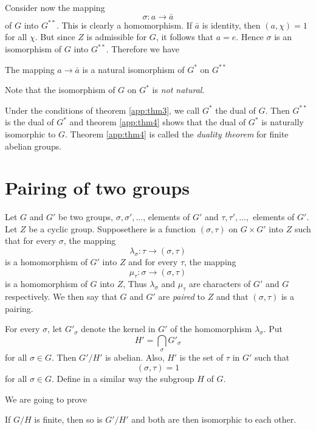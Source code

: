 Consider now the mapping
$$
\sigma : a \to \bar{a}
$$
of $G$ into $G^{**}$. This is clearly a homomorphism. If $\bar{a}$ is
identity, then $(a, \chi)=1$ for all $\chi$. But since $Z$ is
admissible for $G$, it follows that $a = e$. Hence $\sigma$ is an
isomorphism of $G$ into $G^{**}$. Therefore we have   

\begin{thm}\label{app:thm4}%
The mapping $a \to \bar{a}$ is a natural isomorphism of $G^*$ on $G^{**}$
\end{thm}

Note that the isomorphism of $G$ on $G^*$ is \textit{not natural}.

Under the conditions of theorem \ref{app:thm3}, we call $G^*$ the dual of
$G$. Then $G^{**}$ is the dual of $G^*$ and theorem \ref{app:thm4}
shows that the dual of $G^*$ is naturally isomorphic to $G$. Theorem
\ref{app:thm4} is called the \textit{duality theorem} for finite
abelian groups.   

\section{Pairing of two groups}%

Let $G$ and $G'$ be two groups, $\sigma, \sigma' ,\ldots$, elements of
$G'$ and $\tau, \tau' ,\ldots,$ elements of $G'$. Let $Z$ be a cyclic
group. Suppose\pageoriginale there is a function $(\sigma, \tau)$ on
$G \times  G'$ into $Z$ such that for every $\sigma$, the mapping  
$$
\lambda_\sigma : \tau \to (\sigma, \tau)
$$
is a homomorphism of $G'$ into $Z$ and for every $\tau$, the mapping  
$$
\mu_\tau : \sigma \to (\sigma, \tau) 
$$
is a homomorphism of $G$ into $Z$, Thus $\lambda_\sigma$ and
$\mu_\tau$ are characters of $G'$ and $G$ respectively. We then say
that $G$   and $G'$ are \textit{paired} to $Z$ and that $(\sigma, 
\tau)$ is a pairing. 

For every $\sigma$, let $G'_\sigma$ denote the kernel in $G'$ of the
homomorphism $\lambda_\sigma$. Put 
$$
H'=  \bigcap_\sigma G'_\sigma
$$
for all $\sigma \in G$. Then $G' /H'$ is abelian. Also, $H'$ is the
set of $\tau$ in $G'$ such that  
$$
(\sigma, \tau)=1
$$
for all $\sigma \in G$. Define  in a similar way the subgroup  $H$ of
$G$.  

We are going to prove

\begin{thm}%
If $G/H$ is finite, then so is $G'/H'$ and both are then isomorphic to
each other. 
  \end{thm}  

